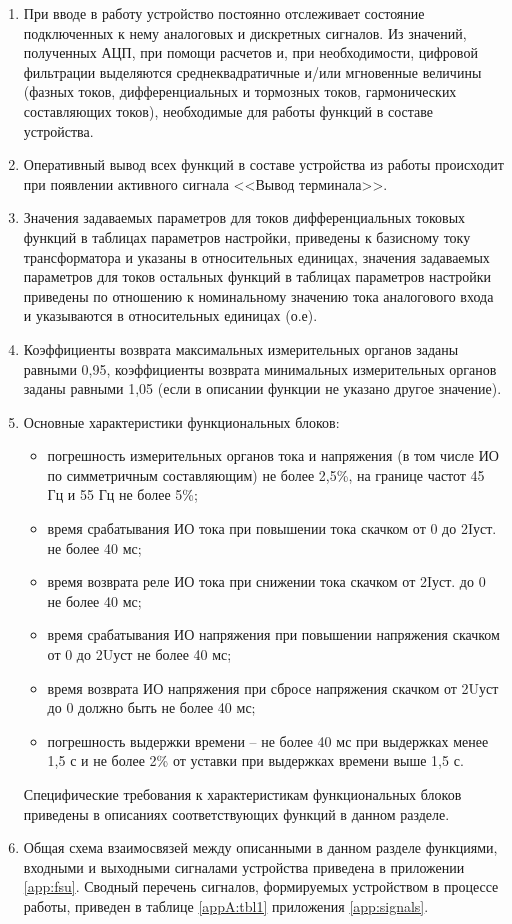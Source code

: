 \documentclass[a4paper, 12pt,table, hidelinks, DIV=calc]{extarticle} %
\begin{document}
\begin{enumerate}[label=\arabic{section}.\arabic{subsection}.\arabic*, labelsep=4pt, leftmargin=0pt, itemindent=57pt]
    
\item
При вводе в работу устройство постоянно отслеживает состояние подключенных к нему аналоговых и дискретных сигналов. Из значений, полученных АЦП, при помощи расчетов и, при необходимости, цифровой фильтрации выделяются среднеквадратичные и/или мгновенные величины (фазных токов, дифференциальных и тормозных токов, гармонических составляющих токов), необходимые для работы функций в составе устройства.
\item
Оперативный вывод всех функций в составе устройства из работы происходит при появлении активного сигнала <<Вывод терминала>>.
\item
Значения задаваемых параметров для токов дифференциальных токовых функций в таблицах параметров настройки, приведены к базисному току трансформатора и указаны в относительных единицах, значения задаваемых параметров для токов остальных функций в таблицах параметров настройки приведены по отношению к номинальному значению тока аналогового входа и указываются в относительных единицах (о.е).  
\item
Коэффициенты возврата максимальных измерительных органов заданы равными 0,95, коэффициенты возврата минимальных измерительных органов заданы равными 1,05 (если в описании функции не указано другое значение).

\item
Основные характеристики функциональных блоков:
\begin{itemize}
    \item погрешность измерительных органов тока и напряжения (в том числе ИО по симметричным составляющим) не более 2,5\%, на границе частот 45 Гц и 55 Гц не более 5\%;
    \item время срабатывания ИО тока при повышении тока скачком от 0 до 2Iуст. не более 40 мс;
    \item время возврата реле ИО тока при снижении тока скачком от 2Iуст. до 0 не более 40 мс;
    \item время срабатывания ИО напряжения при повышении напряжения скачком от 0 до 2Uуст не более 40 мс;
    \item время возврата ИО напряжения при сбросе напряжения скачком от 2Uуст до 0 должно быть не более 40 мс; 
    \item погрешность выдержки времени -- не более 40 мс при выдержках менее 1,5 с и не более 2\% от уставки при выдержках времени выше 1,5 с.
\end{itemize}
Специфические требования к характеристикам функциональных блоков приведены в описаниях соответствующих функций в данном разделе.

\item
Общая схема взаимосвязей между описанными в данном разделе функциями, входными и выходными сигналами устройства приведена в приложении \ref{app:fsu}.
Сводный перечень сигналов, формируемых устройством в процессе работы, приведен в таблице \ref{appA:tbl1} приложения \ref{app:signals}.

\end{enumerate}
\end{document}
